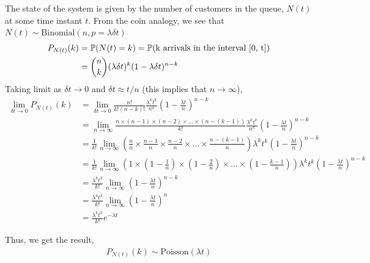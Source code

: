 \documentclass[11pt, a4paper]{report}
\begin{document}
The state of the system is given by the number of customers in the queue, $N(t)$ at some time instant $t$. From the coin analogy, we see that $N(t) \sim \text{Binomial}(n, p=\lambda\delta t)$
\begin{align}
    P_{N(t)}(k) &= {\mathbb{P}}(N(t) = k) = {\mathbb{P}}(\text{k arrivals in the interval [0, t]}) \\
    &= {n \choose k} (\lambda \delta t)^{k} (1 - \lambda \delta t)^{n-k} 
\end{align} 
Taking limit as $\delta t   \rightarrow 0$ and $\delta t \approx t / n$ (this implies that $n \rightarrow \infty$),
\begin{align}
    \lim_{\delta t \rightarrow 0} P_{N(t)}(k) &= \lim_{\delta t \rightarrow 0} \frac{n!}{k! (n-k)!} \frac{\lambda^{k} t^{k}}{n^k} \left( 1 - \frac{\lambda t}{n} \right)^{n-k} \\
    &= \lim_{n \rightarrow \infty} \frac{n \times (n-1) \times (n-2) \times \dots \times (n-(k-1))}{k!} \frac{\lambda^{k} t^{k}}{n^k} \left( 1 - \frac{\lambda t}{n} \right)^{n-k} \\
    &= \frac{1}{k!} \lim_{n \rightarrow \infty} \left( \frac{n}{n} \times \frac{n-1}{n} \times \frac{n-2}{n} \times \dots \times \frac{n-(k-1)}{n} \right) \lambda^{k} t^{k} \left( 1 - \frac{\lambda t}{n} \right)^{n-k} \\
    &= \frac{1}{k!} \lim_{n \rightarrow \infty} \left( 1 \times \left( 1 - \frac{1}{n} \right) \times \left( 1 - \frac{2}{n} \right) \times \dots \times \left( 1 - \frac{k-1}{n} \right) \right) \lambda^{k} t^{k} \left( 1 - \frac{\lambda t}{n} \right)^{n-k} \\
    &= \frac{\lambda^{k} t^{k}}{k!} \lim_{n \rightarrow \infty} \left( 1 - \frac{\lambda t}{n} \right)^{n-k} \\
    &= \frac{\lambda^{k} t^{k}}{k!} \lim_{n \rightarrow \infty} \left( 1 - \frac{\lambda t}{n} \right)^{n} \\
    &= \frac{\lambda^{k} t^{k}}{k!} e^{-\lambda t}
\end{align}


Thus, we get the result, 
\begin{align}
    P_{N(t)}(k) \sim \text{Poisson}(\lambda t) 
\end{align}
\end{document}
